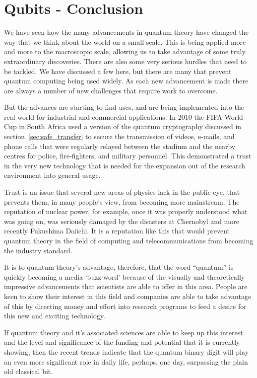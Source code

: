 
\section{Qubits - Conclusion}
We have seen how the many advancements in quantum theory have changed the way that we think about the world on a small scale. This is being applied more and more to the macroscopic scale, allowing us to take advantage of some truly extraordinary discoveries. There are also some very serious hurdles that need to be tackled. We have discussed a few here, but there are many that prevent quantum computing being used widely. As each new advancement is made there are always a number of new challenges that require work to overcome.

But the advances are starting to find uses, and are being implemented into the real world for industrial and commercial applications. In 2010 the FIFA World Cup in South Africa used a version of the quantum cryptography discussed in section~\ref{sec:safe_transfer} to secure the transmission of videos, e-mails, and phone calls that were regularly relayed between the stadium and the nearby centres for police, fire-fighters, and military personnel. This demonstrated a trust in the very new technology that is needed for the expansion out of the research environment into general usage.

Trust is an issue that several new areas of physics lack in the public eye, that prevents them, in many people's view, from becoming more mainstream. The reputation of nuclear power, for example, once it was properly understood what was going on, was seriously damaged by the disasters at Chernobyl and more recently Fukushima Daiichi. It is a reputation like this that would prevent quantum theory in the field of computing and telecommunications from becoming the industry standard.

It is to quantum theory's advantage, therefore, that the word ``quantum'' is quickly becoming a media `buzz-word' because of the visually and theoretically impressive advancements that scientists are able to offer in this area. People are keen to show their interest in this field and companies are able to take advantage of this by directing money and effort into research programs to feed a desire for this new and exciting technology.

If quantum theory and it's associated sciences are able to keep up this interest and the level and significance of the funding and potential that it is currently showing, then the recent trends indicate that the quantum binary digit will play an even more significant role in daily life, perhaps, one day, surpassing the plain old classical bit.
